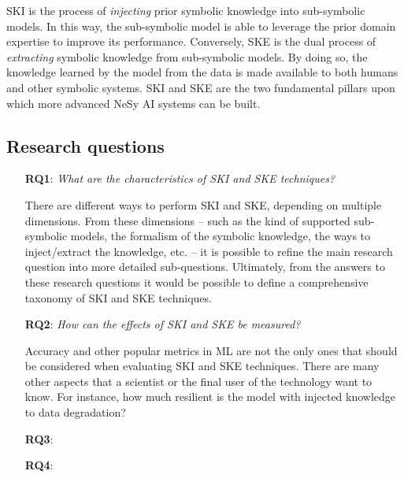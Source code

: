 \begin{refsection}
\Ac{SKI} is the process of \emph{injecting} prior symbolic knowledge into sub-symbolic models.
%
In this way, the sub-symbolic model is able to leverage the prior domain expertise to improve its performance.
%
Conversely, \ac{SKE} is the dual process of \emph{extracting} symbolic knowledge from sub-symbolic models.
%
By doing so, the knowledge learned by the model from the data is made available to both humans and other symbolic systems.
%
\Ac{SKI} and \ac{SKE} are the two fundamental pillars upon which more advanced \ac{NeSy} \ac{AI} systems can be built.


\subsection*{Research questions}
%
\begin{itemize}
    \item[\textbf{RQ1}:]\label{itm:rq1} \emph{What are the characteristics of \ac{SKI} and \ac{SKE} techniques?}

    There are different ways to perform \ac{SKI} and \ac{SKE}, depending on multiple dimensions.
    From these dimensions -- such as the kind of supported sub-symbolic models, the formalism of the symbolic knowledge, the ways to inject/extract the knowledge, etc. -- it is possible to refine the main research question into more detailed sub-questions.
    Ultimately, from the answers to these research questions it would be possible to define a comprehensive taxonomy of \ac{SKI} and \ac{SKE} techniques.
    \item[\textbf{RQ2}:]\label{itm:rq2} \emph{How can the effects of \ac{SKI} and \ac{SKE} be measured?}

    Accuracy and other popular metrics in \ac{ML} are not the only ones that should be considered when evaluating \ac{SKI} and \ac{SKE} techniques.
    There are many other aspects that a scientist or the final user of the technology want to know.
    For instance, how much resilient is the model with injected knowledge to data degradation?
    \item[\textbf{RQ3}:]\label{itm:rq3}
    \item[\textbf{RQ4}:]\label{itm:rq4}
\end{itemize}


\end{refsection}
